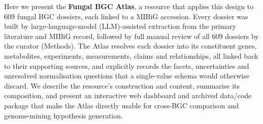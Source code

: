 Here we present the \textbf{Fungal BGC Atlas}, a resource that applies this design to 609 fungal
BGC dossiers, each linked to a MIBiG accession. Every dossier was built by large-language-model
(LLM)-assisted extraction from the primary literature and MIBiG record, followed by full manual
review of all 609 dossiers by the curator (Methods). The Atlas resolves each dossier into its
constituent genes, metabolites, experiments, measurements, claims and relationships, all linked back
to their supporting sources, and explicitly records the facets, uncertainties and unresolved
normalisation questions that a single-value schema would otherwise discard. We describe the
resource's construction and content, summarise its composition, and present an interactive web
dashboard and archived data/code package that make the Atlas directly usable for cross-BGC
comparison and genome-mining hypothesis generation.
